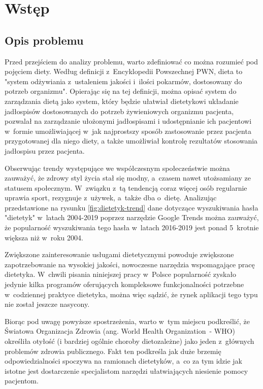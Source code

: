 \chapter*{Wstęp}\label{ch:admission}

\section*{Opis problemu}\label{sec:problem-description}

Przed przejściem do analizy problemu, warto zdefiniować co można rozumieć pod pojęciem diety.
Według definicji z~Encyklopedii Powszechnej PWN, dieta to "system odżywiania z~ustaleniem jakości i~ilości pokarmów,
dostosowany do potrzeb organizmu"\cite{book:encyklopedia-dieta}.
Opierając się na tej definicji, można opisać system do zarządzania dietą jako system,
który będzie ułatwiał dietetykowi układanie jadłospisów dostosowanych do potrzeb żywieniowych organizmu pacjenta, pozwalał na zarządzanie ułożonymi jadłospisami
i udostępnianie ich pacjentowi w~formie umożliwiającej w~jak najprostszy sposób zastosowanie przez pacjenta przygotowanej dla niego diety,
a także umożliwiał kontrolę rezultatów stosowania jadłospisu przez pacjenta.

\par
Obserwując trendy występujące we współczesnym społeczeństwie można zauważyć, że zdrowy styl życia stał się modny, a~czasem nawet utożsamiany ze statusem społecznym.
W~związku z~tą tendencją coraz więcej osób regularnie uprawia sport, rezygnuje z~używek, a~także dba o~dietę.
Analizując przedstawione na rysunku \ref{fig:dietetyk-trend} dane dotyczące wyszukiwania hasła "dietetyk" w~latach 2004-2019 poprzez narzędzie Google Trends\cite{url:google-trends} można zauważyć,
że popularność wyszukiwania tego hasła w~latach 2016-2019 jest ponad 5~krotnie większa niż w~roku 2004.


Zwiększone zainteresowanie usługami dietetycznymi powoduje zwiększone zapotrzebowanie na wysokiej jakości, nowoczesne narzędzia wspomagające pracę dietetyka.
W~chwili pisania niniejszej pracy w~Polsce popularność zyskało jedynie kilka programów oferujących kompleksowe funkcjonalności potrzebne w~codziennej praktyce dietetyka,
można więc sądzić, że rynek aplikacji tego typu nie został jeszcze nasycony.

\par
Biorąc pod uwagę powyższe spostrzeżenia, warto w~tym miejscu podkreślić, że Światowa Organizacja Zdrowia (ang. World Health Organization~- WHO) określiła otyłość
(i bardziej ogólnie choroby dietozależne) jako jeden z~głównych problemów zdrowia publicznego\cite{article:dietetyk-na-rynku-uslug-medycznych}.
Fakt ten podkreśla jak duże brzemię odpowiedzialności spoczywa na ramionach dietetyków,
a~co za tym idzie jak istotne jest dostarczenie specjalistom narzędzi ułatwiających niesienie pomocy pacjentom.

